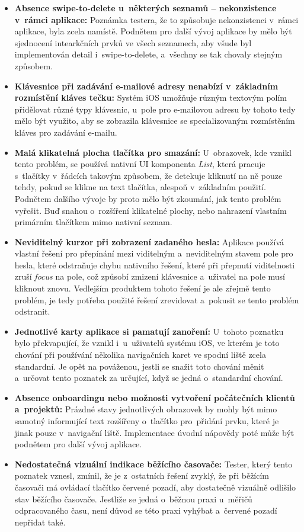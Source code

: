 \begin{itemize}
\item\textbf{Absence swipe-to-delete u~některých seznamů – nekonzistence v~rámci aplikace:} Poznámka testera, že to způsobuje nekonzistenci v~rámci aplikace, byla zcela namístě. Podnětem pro další vývoj aplikace by mělo být sjednocení intearkčních prvků ve všech seznamech, aby všude byl implementován detail i~swipe-to-delete, a~všechny se tak chovaly stejným způsobem.
\item\textbf{Klávesnice při zadávání e-mailové adresy nenabízí v~základním rozmístění kláves tečku:} Systém iOS umožňuje různým textovým polím přidělovat různé typy klávesnic, u~pole pro e-mailovou adresu by tohoto tedy mělo být využito, aby se zobrazila klávesnice se specializovaným rozmístěním kláves pro zadávání e-mailu.
\item\textbf{Malá klikatelná plocha tlačítka pro smazání:} U~obrazovek, kde vznikl tento problém, se používá nativní UI komponenta \emph{List}, která pracuje s~tlačítky v~řádcích takovým způsobem, že detekuje kliknutí na ně pouze tehdy, pokud se klikne na text tlačítka, alespoň v~základním použití. Podnětem dalšího vývoje by proto mělo být zkoumání, jak tento problém vyřešit. Buď snahou o~rozšíření klikatelné plochy, nebo nahrazení vlastním primárním tlačítkem mimo nativní seznam.
\item\textbf{Neviditelný kurzor při zobrazení zadaného hesla:} Aplikace používá vlastní řešení pro přepínání mezi viditelným a~neviditelným stavem pole pro hesla, které odstraňuje chybu nativního řešení, které při přepnutí viditelnosti zruší \emph{focus} na pole, což způsobí zmizení klávesnice a~uživatel na pole musí kliknout znovu. Vedlejším produktem tohoto řešení je ale zřejmě tento problém, je tedy potřeba použité řešení zrevidovat a~pokusit se tento problém odstranit.
\item\textbf{Jednotlivé karty aplikace si pamatují zanoření:} U~tohoto poznatku bylo překvapující, že vznikl i~u~uživatelů systému iOS, ve kterém je toto chování při používání několika navigačních karet ve spodní liště zcela standardní. Je opět na pováženou, jestli se snažit toto chování měnit a~určovat tento poznatek za určující, když se jedná o~standardní chování.
\item\textbf{Absence onboardingu nebo možnosti vytvoření počátečních klientů a~projektů:} Prázdné stavy jednotlivých obrazovek by mohly být mimo samotný informující text rozšířeny o~tlačítko pro~přidání prvku, které je jinak pouze v~navigační liště. Implementace úvodní nápovědy poté může být podnětem pro další vývoj aplikace.
\item\textbf{Nedostatečná vizuální indikace běžícího časovače:} Tester, který tento poznatek vznesl, zmínil, že je z~ostatních řešení zvyklý, že při běžícím časovači má ovládací tlačítko červené pozadí, aby dostatečně vizuálně odlišilo stav běžícího časovače. Jestliže se jedná o~běžnou praxi u~měřičů odpracovaného času, není důvod se této praxi vyhýbat a~červené pozadí nepřidat také.

\end{itemize}
